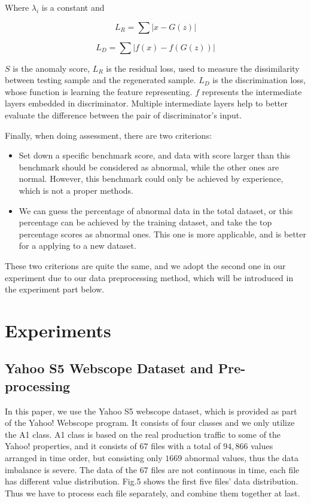 \documentclass{acmtog} %
\begin{document}
Where $\lambda_i$ is a constant and 

\begin{equation}
L_R = \sum|x-G(z)| 
\end{equation}

\begin{equation}
L_D = \sum|f(x)-f(G(z))|
\end{equation}

$S$ is the anomaly score, $L_R$ is the residual loss, used to measure the dissimilarity between testing sample and the regenerated sample. $L_D$ is the discrimination loss, whose function is learning the feature representing. $f$ represents the intermediate layers embedded in discriminator. Multiple intermediate layers help to better evaluate the difference between the pair of discriminator’s input. 

Finally, when doing assessment, there are two criterions:
\begin{itemize}
	\item Set down a specific benchmark score, and data with score larger than this benchmark should be considered as abnormal, while the other ones are normal. However, this benchmark could only be achieved by experience, which is not a proper methods.
	\item We can guess the percentage of abnormal data in the total dataset, or this percentage can be achieved by the training dataset, and take the top percentage scores as abnormal ones. This one is more applicable, and is better for a applying to a new dataset.
\end{itemize}

These two criterions are quite the same, and we adopt the second one in our experiment due to our data preprocessing method, which will be introduced in the experiment part below.

\section{Experiments}
\subsection{Yahoo S5 Webscope Dataset and Pre-processing}
In this paper, we use the Yahoo S5 webscope dataset, which is provided as part of the Yahoo! Webscope program. It consists of four classes and we only utilize the A1 class. A1 class is based on the real production traffic to some of the Yahoo! properties, and it consists of $67$ files with a total of $94,866$ values arranged in time order, but consisting only $1669$ abnormal values, thus the data imbalance is severe. The data of the $67$ files are not continuous in time, each file has different value distribution. Fig.5 shows the first five files' data distribution. Thus we have to process each file separately, and combine them together at last.
\end{document}

